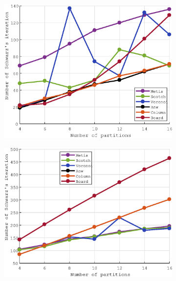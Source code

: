 \documentclass[a4paper,11pt]{article}
\begin{document}
\begin{figure}[H]
	\centering
	\begin{subfigure}[t]{0.45\textwidth}
	\centering
	\includegraphics[width=\textwidth]{robin_300x300_5_iter.eps}
	\end{subfigure}
	\hfill
	\begin{subfigure}[t]{0.45\textwidth}
	\centering
	\includegraphics[width=\textwidth]{dirichlet_300x300_5_iter.eps}
	\end{subfigure}
\end{figure}
\vspace{-9mm}
\end{document}
